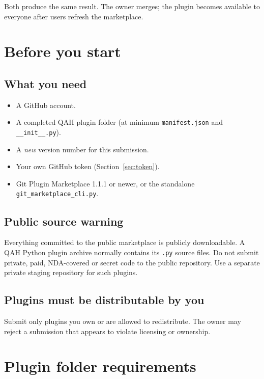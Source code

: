 \documentclass[11pt,a4paper]{article}
\newcommand{\code}[1]{\texttt{#1}}
\begin{document}
Both produce the same result. The owner merges; the plugin becomes available to
everyone after users refresh the marketplace.

\section{Before you start}

\subsection{What you need}

\begin{itemize}[leftmargin=1.5em]
  \item A GitHub account.
  \item A completed QAH plugin folder (at minimum \code{manifest.json} and
        \code{\_\_init\_\_.py}).
  \item A \emph{new} version number for this submission.
  \item Your own GitHub token (Section~\ref{sec:token}).
  \item Git Plugin Marketplace 1.1.1 or newer, or the standalone
        \code{git\_marketplace\_cli.py}.
\end{itemize}

\subsection{Public source warning}

Everything committed to the public marketplace is publicly downloadable. A QAH
Python plugin archive normally contains its \code{.py} source files. Do not
submit private, paid, NDA-covered or secret code to the public repository. Use a
separate private staging repository for such plugins.

\subsection{Plugins must be distributable by you}

Submit only plugins you own or are allowed to redistribute. The owner may reject
a submission that appears to violate licensing or ownership.

\section{Plugin folder requirements}
\end{document}
